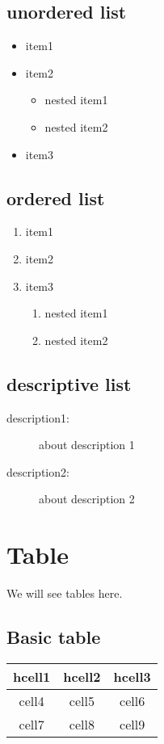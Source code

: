 \documentclass[14pt]{article}
\begin{document}
\subsection{unordered list}
\begin{itemize}
    \item item1
    \item item2
    \begin{itemize}
        \item nested item1
        \item nested item2
    \end{itemize}
    \item item3
\end{itemize}
\subsection{ordered list}
\begin{enumerate}
    \item item1
    \item item2
    \item item3
    \begin{enumerate}
        \item nested item1
        \item nested item2
    \end{enumerate}
\end{enumerate}
\subsection{descriptive list}
\begin{description}
\item[description1:] about description 1
\item[description2:] about description 2
\end{description}
\section{Table}
We will see tables here.
\subsection{Basic table}
\begin{tabular}{|c|c|c|}
\hline
\textbf{hcell1} & \textbf{hcell2} & \textbf{hcell3}\\
\hline
cell4 & cell5 & cell6\\
\hline
cell7 & cell8 & cell9\\
\hline
\end{tabular}
\end{document}

